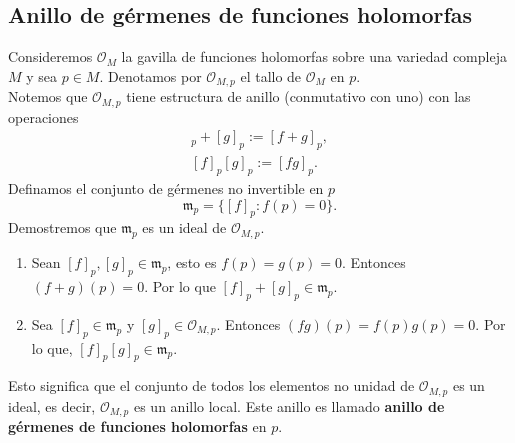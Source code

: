     \subsection{Anillo de gérmenes de funciones holomorfas}
    \begin{example}
        Consideremos $\mathscr{O}_M$ la gavilla de funciones holomorfas sobre una variedad compleja $M$ y sea $p\in M$. Denotamos por $\mathscr{O}_{M,p}$ el tallo de $\mathscr{O}_M$ en $p$.\\
        Notemos que $\mathscr{O}_{M,p}$ tiene estructura de anillo (conmutativo con uno) con las operaciones
        \begin{align*}
            [f]_p+[g]_p:=[f+g]_p,\\
            [f]_p[g]_p:=[fg]_p.
        \end{align*}
        Definamos el conjunto de gérmenes no invertible en $p$
        \begin{equation*}
            \mathfrak{m}_p=\{[f]_p:f(p)=0\}.
        \end{equation*}
        Demostremos que $\mathfrak{m}_p$ es un ideal de $\mathscr{O}_{M,p}$.
        \begin{enumerate}
            \item Sean $[f]_p,[g]_p\in \mathfrak{m}_p$, esto es $f(p)=g(p)=0$. Entonces $(f+g)(p)=0$. Por lo que $[f]_p+[g]_p\in\mathfrak{m}_p $.
            \item Sea $[f]_p\in \mathfrak{m}_p$ y $[g]_p\in\mathscr{O}_{M,p}$. Entonces $(fg)(p)=f(p)g(p)=0$.
            Por lo que, $[f]_p[g]_p\in \mathfrak{m}_p$.
        \end{enumerate}
        Esto significa que el conjunto de todos los elementos no unidad de $\mathscr{O}_{M,p}$ es un ideal, es decir, $\mathscr{O}_{M,p}$ es un anillo local. Este anillo es llamado \textbf{anillo de gérmenes de funciones holomorfas} en $p$.
    \end{example}

